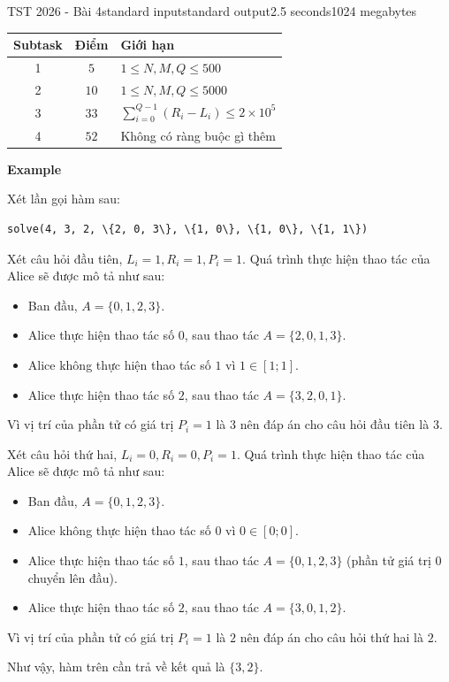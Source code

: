 \begin{problem}{TST 2026 - Bài 4}{standard input}{standard output}{2.5 seconds}{1024 megabytes}
\Scoring
\begin{center}
  \begin{tabular}{|c|c|l|} \hline
    \textbf{Subtask} & \textbf{Điểm} & \textbf{Giới hạn} \\ \hline
    1 & $5$  & $1\le N, M, Q \le 500$ \\ \hline
    2 & $10$ & $1\le N, M, Q \le 5000$ \\ \hline
    3 & $33$ & $\sum_{i=0}^{Q-1} (R_i-L_i) \le 2\times 10^5$ \\ \hline
    4 & $52$ & Không có ràng buộc gì thêm \\ \hline
  \end{tabular}
\end{center}


\Example

\begin{example}
%
\end{example}

\Note
\textbf{Example}

Xét lần gọi hàm sau:

\begin{lstlisting}
solve(4, 3, 2, \{2, 0, 3\}, \{1, 0\}, \{1, 0\}, \{1, 1\})
\end{lstlisting}

Xét câu hỏi đầu tiên, $L_i=1, R_i=1, P_i=1$. Quá trình thực hiện thao tác của Alice sẽ được mô tả như sau:
\begin{itemize}
    \item Ban đầu, $A=\{0,1,2,3\}$.
    \item Alice thực hiện thao tác số $0$, sau thao tác $A=\{2,0,1,3\}$.
    \item Alice không thực hiện thao tác số $1$ vì $1\in [1;1]$.
    \item Alice thực hiện thao tác số $2$, sau thao tác $A=\{3,2,0,1\}$.
\end{itemize}

Vì vị trí của phần tử có giá trị $P_i=1$ là $3$ nên đáp án cho câu hỏi đầu tiên là $3$.

Xét câu hỏi thứ hai, $L_i=0, R_i=0, P_i=1$. Quá trình thực hiện thao tác của Alice sẽ được mô tả như sau:
\begin{itemize}
    \item Ban đầu, $A=\{0,1,2,3\}$.
    \item Alice không thực hiện thao tác số $0$ vì $0\in [0;0]$.
    \item Alice thực hiện thao tác số $1$, sau thao tác $A=\{0,1,2,3\}$ (phần tử giá trị $0$ chuyển lên đầu).
    \item Alice thực hiện thao tác số $2$, sau thao tác $A=\{3,0,1,2\}$.
\end{itemize}

Vì vị trí của phần tử có giá trị $P_i=1$ là $2$ nên đáp án cho câu hỏi thứ hai là $2$.

Như vậy, hàm trên cần trả về kết quả là $\{3,2\}$.

\end{problem}

